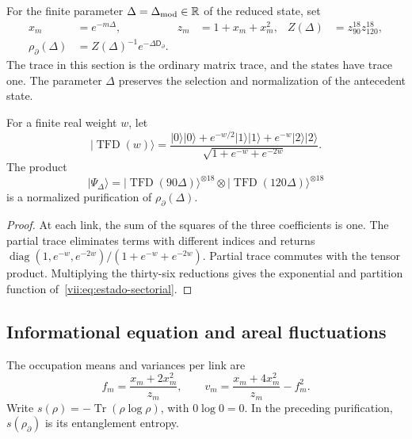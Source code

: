 For the finite parameter \(\Delta=\Delta_{\rm mod}\in\mathbb R\) of the
reduced state, set
\begin{align}
 x_m&=e^{-m\Delta},& z_m&=1+x_m+x_m^2,&
 Z(\Delta)&=z_{90}^{18}z_{120}^{18},\\
 \rho_\partial(\Delta)&=Z(\Delta)^{-1}e^{-\Delta\mathsf D_\partial}.
 \label{vii:eq:estado-sectorial}
\end{align}
The trace in this section is the ordinary matrix trace, and the states
have trace one. The parameter \(\Delta\) preserves the selection and
normalization of the antecedent state.

\begin{proposition}
\label{vii:prop:purificacion-sectorial}
For a finite real weight \(w\), let
\begin{equation}
 |\operatorname{TFD}(w)\rangle
 =\frac{|0\rangle|0\rangle+e^{-w/2}|1\rangle|1\rangle
                   +e^{-w}|2\rangle|2\rangle}
        {\sqrt{1+e^{-w}+e^{-2w}}}.
 \label{vii:eq:tfd-local}
\end{equation}
The product
\begin{equation}
 |\Psi_\Delta\rangle
 =|\operatorname{TFD}(90\Delta)\rangle^{\otimes18}
  \otimes|\operatorname{TFD}(120\Delta)\rangle^{\otimes18}
 \label{vii:eq:tfd-sectorial}
\end{equation}
is a normalized purification of \(\rho_\partial(\Delta)\).
\end{proposition}
\begin{proof}
At each link, the sum of the squares of the three coefficients is one.
The partial trace eliminates terms with different indices and returns
\(\operatorname{diag}(1,e^{-w},e^{-2w})/(1+e^{-w}+e^{-2w})\).
Partial trace commutes with the tensor product. Multiplying the
thirty-six reductions gives the exponential and partition function
of~\eqref{vii:eq:estado-sectorial}.
\end{proof}

\subsection{Informational equation and areal fluctuations}
\label{vii:subsec:ecuacion-informacional}

The occupation means and variances per link are
\begin{equation}
 f_m=\frac{x_m+2x_m^2}{z_m},\qquad
 v_m=\frac{x_m+4x_m^2}{z_m}-f_m^2.
 \label{vii:eq:momentos-sectoriales}
\end{equation}
Write \(s(\rho)=-\operatorname{Tr}(\rho\log\rho)\), with
\(0\log0=0\). In the preceding purification, \(s(\rho_\partial)\)
is its entanglement entropy.

